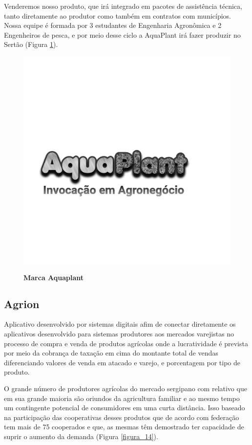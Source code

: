 Venderemos nosso produto, que irá integrado em pacotes de assistência técnica, tanto diretamente ao produtor como também em contratos com municípios. Nossa equipe é formada por 3 estudantes de Engenharia Agronômica e 2 Engenheiros de pesca, e por meio desse ciclo a AquaPlant irá fazer produzir no Sertão (Figura \ref{figura_13}).


\begin{figure}[H]
\centering
\caption{\textbf{Marca Aquaplant}}
\includegraphics[scale=0.4]{Imagens/aquaplant.png}
\label{figura_13}
\end{figure}


\subsection{Agrion}

Aplicativo desenvolvido por sistemas digitais afim de conectar diretamente os aplicativos desenvolvido para sistemas produtores aos mercados varejistas no processo de compra e venda de produtos agrícolas onde a lucratividade é prevista por meio da cobrança de taxação em cima do montante total de vendas diferenciando valores de venda em atacado e varejo, e porcentagem por tipo de produto.

O grande número de produtores agrícolas  do mercado sergipano com relativo que  em sua grande maioria são oriundos da agricultura familiar e ao mesmo tempo um contingente potencial de consumidores em uma curta distância. Isso baseado na  participação das cooperativas desses produtos que de acordo 
com federação tem mais de 75 cooperados e que, as mesmas têm demostrado ter capacidade de suprir o aumento da demanda (Figura \ref{figura_14}).


